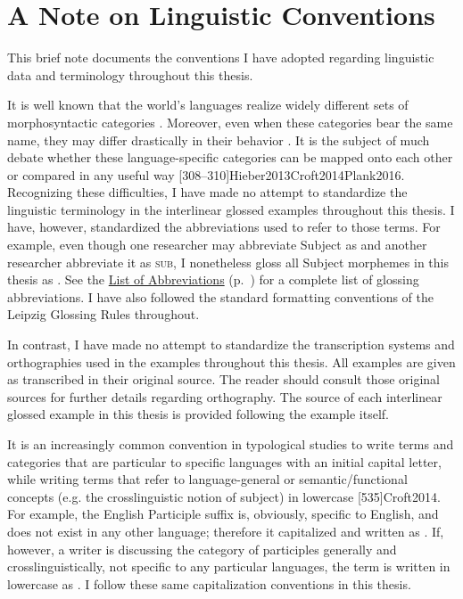 \chapter*{A Note on Linguistic Conventions}
\label{ch:conventions}

This brief note documents the conventions I have adopted regarding linguistic data and terminology throughout this thesis.

It is well known that the world's languages realize widely different sets of morphosyntactic categories . Moreover, even when these categories bear the same name, they may differ drastically in their behavior \citep[9]{Dixon2010}. It is the subject of much debate whether these language-specific categories can be mapped onto each other or compared in any useful way [308--310]{Hieber2013}{Croft2014}{Plank2016}. Recognizing these difficulties, I have made no attempt to standardize the linguistic terminology in the interlinear glossed examples throughout this thesis. I have, however, standardized the abbreviations used to refer to those terms. For example, even though one researcher may abbreviate Subject as  and another researcher abbreviate it as \textsc{sub}, I nonetheless gloss all Subject morphemes in this thesis as . See the \hyperref[ch:abbreviations]{List of Abbreviations} (p.~\pageref{ch:abbreviations}) for a complete list of glossing abbreviations. I have also followed the standard formatting conventions of the Leipzig Glossing Rules \citep{BickelComrieHaspelmath2015} throughout.

In contrast, I have made no attempt to standardize the transcription systems and orthographies used in the examples throughout this thesis. All examples are given as transcribed in their original source. The reader should consult those original sources for further details regarding orthography. The source of each interlinear glossed example in this thesis is provided following the example itself.

It is an increasingly common convention in typological studies to write terms and categories that are particular to specific languages with an initial capital letter, while writing terms that refer to language-general or semantic/functional concepts (e.g. the crosslinguistic notion of subject) in lowercase [535]{Croft2014}. For example, the English Participle suffix  is, obviously, specific to English, and does not exist in any other language; therefore it capitalized and written as . If, however, a writer is discussing the category of participles generally and crosslinguistically, not specific to any particular languages, the term is written in lowercase as . I follow these same capitalization conventions in this thesis.
